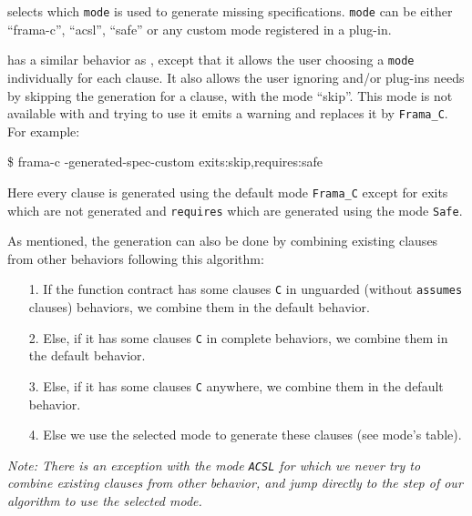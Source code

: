 \begin{description}
  \item \texttt{} selects which
  \texttt{mode} is used to generate missing specifications. \texttt{mode} can be
  either ``frama-c'', ``acsl'', ``safe'' or any custom mode registered in a
  plug-in.

  \item \texttt{} has a similar behavior as
  , except that it allows the user choosing a
  \texttt{mode} individually for each clause. It also allows the user ignoring
  \FramaC and/or plug-ins needs by skipping the generation for a clause, with
  the mode ``skip''. This mode is not available with
   and trying to use it emits a warning and
  replaces it by \texttt{Frama\_C}. For example:
  \begin{frama-c-commands}
    \$ frama-c -generated-spec-custom exits:skip,requires:safe
  \end{frama-c-commands}
  Here every clause is generated using the default mode \texttt{Frama\_C} except
  for exits which are not generated and \texttt{requires} which are generated
  using the mode \texttt{Safe}.
\end{description}

As mentioned, the generation can also be done by combining existing clauses
from other behaviors following this algorithm:
\begin{itemize}
  \item[1.] If the function contract has some clauses \texttt{C} in unguarded
  (without \texttt{assumes} clauses) behaviors, we combine them in the default
  behavior.
  \item[2.] Else, if it has some clauses \texttt{C} in complete behaviors, we
  combine them in the default behavior.
  \item[3.] Else, if it has some clauses \texttt{C} anywhere, we combine them in
  the default behavior.
  \item[4.] Else we use the selected mode to generate these clauses (see mode's
  table).
\end{itemize}

{\em Note: There is an exception with the mode \texttt{ACSL} for which we never
try to combine existing clauses from other behavior, and jump directly to the
step of our algorithm to use the selected mode.}\\

